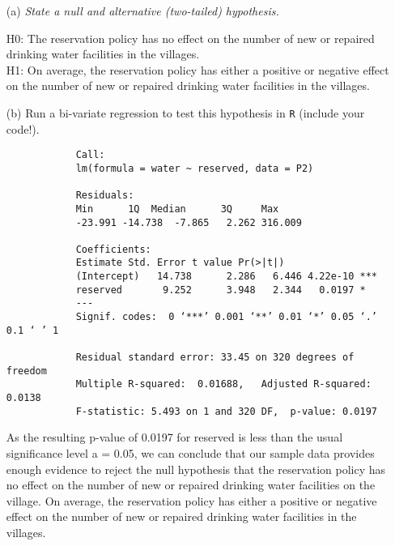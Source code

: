 \documentclass[12pt,letterpaper]{article}
\begin{document}
	\begin{enumerate}
		\item [(a)] \emph{State a null and alternative (two-tailed) hypothesis.}
		\vspace{.5cm}
		
		\noindent  
		H0: The reservation policy has no effect on the number of new or repaired 
		drinking water facilities in the villages. \\
		
		H1: On average, the reservation policy has either a positive or negative effect on the number of new or repaired drinking water facilities in the villages.\\
		
		\vspace{.5cm}
		\newpage
		
		\item [(b)] Run a bi-variate regression to test this hypothesis in \texttt{R} (include your code!).
		
		
		
		\begin{verbatim} 
			Call:
			lm(formula = water ~ reserved, data = P2)
			
			Residuals:
			Min      1Q  Median      3Q     Max 
			-23.991 -14.738  -7.865   2.262 316.009 
			
			Coefficients:
			Estimate Std. Error t value Pr(>|t|)    
			(Intercept)   14.738      2.286   6.446 4.22e-10 ***
			reserved       9.252      3.948   2.344   0.0197 *  
			---
			Signif. codes:  0 ‘***’ 0.001 ‘**’ 0.01 ‘*’ 0.05 ‘.’ 0.1 ‘ ’ 1
			
			Residual standard error: 33.45 on 320 degrees of freedom
			Multiple R-squared:  0.01688,	Adjusted R-squared:  0.0138 
			F-statistic: 5.493 on 1 and 320 DF,  p-value: 0.0197
		\end{verbatim}
		\vspace{.5cm}
		
		\noindent As the resulting p-value of 0.0197 for reserved is less than the usual significance level a = 0.05, we can conclude that our sample data provides enough evidence to reject the null hypothesis that the reservation policy has no effect on the number of new or repaired drinking water facilities on the village. On average, the reservation policy has either a positive or negative effect on the  number of new or repaired drinking water facilities in the villages.
		
		\newpage
		

\end{enumerate}
\end{document}
